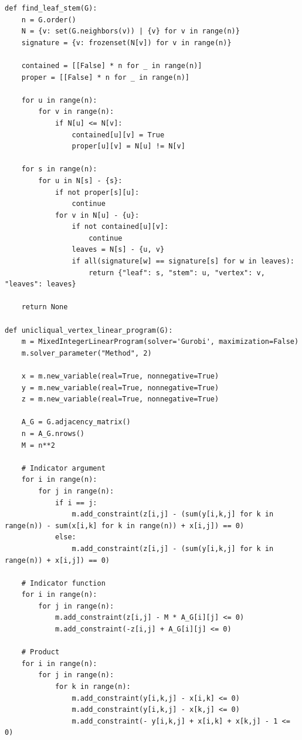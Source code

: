 \begin{lstlisting}[style=python, caption={Unicliqual Vertex Linear Program.}, label={lst::unicliqaul_vertex_linear_program}]
def find_leaf_stem(G):
    n = G.order()
    N = {v: set(G.neighbors(v)) | {v} for v in range(n)}
    signature = {v: frozenset(N[v]) for v in range(n)}

    contained = [[False] * n for _ in range(n)]
    proper = [[False] * n for _ in range(n)]

    for u in range(n):
        for v in range(n):
            if N[u] <= N[v]:
                contained[u][v] = True
                proper[u][v] = N[u] != N[v]

    for s in range(n):
        for u in N[s] - {s}:
            if not proper[s][u]:
                continue
            for v in N[u] - {u}:
                if not contained[u][v]:
                    continue
                leaves = N[s] - {u, v}
                if all(signature[w] == signature[s] for w in leaves):
                    return {"leaf": s, "stem": u, "vertex": v, "leaves": leaves}

    return None

def unicliqual_vertex_linear_program(G):
    m = MixedIntegerLinearProgram(solver='Gurobi', maximization=False)
    m.solver_parameter("Method", 2)

    x = m.new_variable(real=True, nonnegative=True)
    y = m.new_variable(real=True, nonnegative=True)
    z = m.new_variable(real=True, nonnegative=True)

    A_G = G.adjacency_matrix()
    n = A_G.nrows()
    M = n**2

    # Indicator argument
    for i in range(n):
        for j in range(n):
            if i == j:
                m.add_constraint(z[i,j] - (sum(y[i,k,j] for k in range(n)) - sum(x[i,k] for k in range(n)) + x[i,j]) == 0)
            else:
                m.add_constraint(z[i,j] - (sum(y[i,k,j] for k in range(n)) + x[i,j]) == 0)

    # Indicator function
    for i in range(n):
        for j in range(n):
            m.add_constraint(z[i,j] - M * A_G[i][j] <= 0)
            m.add_constraint(-z[i,j] + A_G[i][j] <= 0)

    # Product
    for i in range(n):
        for j in range(n):
            for k in range(n):
                m.add_constraint(y[i,k,j] - x[i,k] <= 0)
                m.add_constraint(y[i,k,j] - x[k,j] <= 0)
                m.add_constraint(- y[i,k,j] + x[i,k] + x[k,j] - 1 <= 0)


\end{lstlisting}
